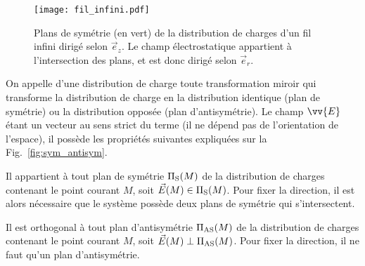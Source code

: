 \documentclass[12pt,fancy]{/Users/victor/Documents/COURS/2ACapECL/texmf/tex/latex/Preambles/cours}
\begin{document}
\begin{figure}[H]
\centering
\texttt{[image: fil\_infini.pdf]}
\caption{Plans de symétrie (en vert) de la distribution de charges d'un fil infini dirigé selon $\vec{e}_z$. Le champ électrostatique appartient à l'intersection des plans, et est donc dirigé selon $\vec{e}_r$.}
\label{fig:fil_infini}
\end{figure}

On appelle  d’une distribution de charge toute transformation miroir qui transforme la distribution de charge en la distribution identique (plan de symétrie) ou la distribution opposée (plan d’antisymétrie).
%
Le champ $\vv{E}$ étant un vecteur au sens strict du terme (il ne dépend pas de l’orientation de l’espace), il possède les propriétés suivantes expliquées sur la Fig.~\ref{fig:sym_antisym}.

\begin{liste}
\item Il appartient à tout plan de symétrie $\Pi_{\rm{S}}(M)$ de la distribution de charges contenant le point courant $M$, soit $\Vec{E}(M) \in \Pi_{\rm{S}}(M)$. Pour fixer la direction, il est alors nécessaire que le système possède deux plans de symétrie qui s’intersectent.
\item Il est orthogonal à tout plan d'antisymétrie $\Pi_{\rm{AS}}(M)$ de la distribution de charges contenant le point courant $M$, soit $\Vec{E}(M) \perp \Pi_{\rm{AS}}(M)$. Pour fixer la direction, il ne faut qu’un plan d’antisymétrie.
\end{liste}
\end{document}
